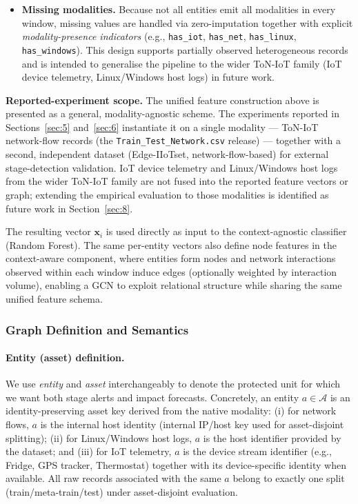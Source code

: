 \documentclass[pdflatex,sn-mathphys-num]{sn-jnl}
\theoremstyle{thmstyleone}%
\theoremstyle{thmstyletwo}%
\theoremstyle{thmstylethree}%
\begin{document}
\begin{itemize}
    \item \textbf{Missing modalities.} Because not all entities emit all modalities in every window, missing values are handled via zero-imputation together with explicit \emph{modality-presence indicators} (e.g., \texttt{has\_iot}, \texttt{has\_net}, \texttt{has\_linux}, \texttt{has\_windows}). This design supports partially observed heterogeneous records and is intended to generalise the pipeline to the wider ToN-IoT family (IoT device telemetry, Linux/Windows host logs) in future work.
\end{itemize}

\textbf{Reported-experiment scope.} The unified feature construction above is presented as a general, modality-agnostic scheme. The experiments reported in Sections~\ref{sec:5} and~\ref{sec:6} instantiate it on a single modality --- ToN-IoT network-flow records (the \texttt{Train\_Test\_Network.csv} release) --- together with a second, independent dataset (Edge-IIoTset, network-flow-based) for external stage-detection validation. IoT device telemetry and Linux/Windows host logs from the wider ToN-IoT family are not fused into the reported feature vectors or graph; extending the empirical evaluation to those modalities is identified as future work in Section~\ref{sec:8}.

The resulting vector $\mathbf{x}_i$ is used directly as input to the context-agnostic classifier (Random Forest). The same per-entity vectors also define node features in the context-aware component, where entities form nodes and network interactions observed within each window induce edges (optionally weighted by interaction volume), enabling a GCN to exploit relational structure while sharing the same unified feature schema.


\subsubsection{Graph Definition and Semantics}
\label{sec:graph_definition}

\paragraph{Entity (asset) definition.}
We use \emph{entity} and \emph{asset} interchangeably to denote the protected unit for which we want both stage alerts and impact forecasts.
Concretely, an entity $a\in\mathcal{A}$ is an identity-preserving asset key derived from the native modality:
(i) for network flows, $a$ is the internal host identity (internal IP/host key used for asset-disjoint splitting);
(ii) for Linux/Windows host logs, $a$ is the host identifier provided by the dataset;
and (iii) for IoT telemetry, $a$ is the device stream identifier (e.g., Fridge, GPS tracker, Thermostat) together with its device-specific identity when available.
All raw records associated with the same $a$ belong to exactly one split (train/meta-train/test) under asset-disjoint evaluation.
\end{document}
